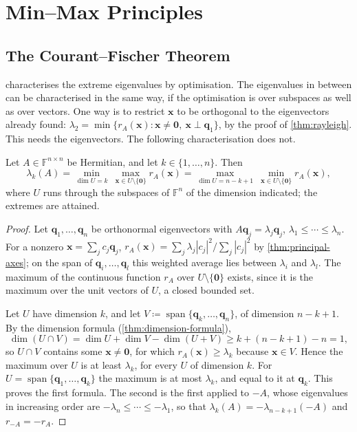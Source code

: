 \section{Min--Max Principles}
\label{sec:min-max}

\subsection{The Courant--Fischer Theorem}

 characterises the extreme eigenvalues by optimisation. The eigenvalues in between can be characterised in the same way, if the optimisation is over subspaces as well as over vectors. One way is to restrict $\mathbf x$ to be orthogonal to the eigenvectors already found: $\lambda_2=\min\{r_A(\mathbf x):\mathbf x\ne\mathbf 0,\ \mathbf x\perp\mathbf q_1\}$, by the proof of \cref{thm:rayleigh}. This needs the eigenvectors. The following characterisation does not.

\begin{theorem}
\label{thm:courant-fischer}
Let $A\in\mathbb F^{n\times n}$ be Hermitian, and let $k\in\{1,\ldots,n\}$. Then
\[
\lambda_k(A)=\min_{\dim U=k}\ \max_{\mathbf x\in U\setminus\{\mathbf 0\}}r_A(\mathbf x)=\max_{\dim U=n-k+1}\ \min_{\mathbf x\in U\setminus\{\mathbf 0\}}r_A(\mathbf x),
\]
where $U$ runs through the subspaces of $\mathbb F^n$ of the dimension indicated; the extremes are attained.
\end{theorem}

\begin{proof}
Let $\mathbf q_1,\ldots,\mathbf q_n$ be orthonormal eigenvectors with $A\mathbf q_j=\lambda_j\mathbf q_j$, $\lambda_1\le\cdots\le\lambda_n$. For a nonzero $\mathbf x=\sum_jc_j\mathbf q_j$, $r_A(\mathbf x)=\sum_j\lambda_j|c_j|^2/\sum_j|c_j|^2$ by \cref{thm:principal-axes}; on the span of $\mathbf q_i,\ldots,\mathbf q_l$ this weighted average lies between $\lambda_i$ and $\lambda_l$. The maximum of the continuous function $r_A$ over $U\setminus\{\mathbf 0\}$ exists, since it is the maximum over the unit vectors of $U$, a closed bounded set.

Let $U$ have dimension $k$, and let $V\coloneqq\operatorname{span}\{\mathbf q_k,\ldots,\mathbf q_n\}$, of dimension $n-k+1$. By the dimension formula (\cref{thm:dimension-formula}),
\[
\dim(U\cap V)=\dim U+\dim V-\dim(U+V)\ge k+(n-k+1)-n=1 ,
\]
so $U\cap V$ contains some $\mathbf x\ne\mathbf 0$, for which $r_A(\mathbf x)\ge\lambda_k$ because $\mathbf x\in V$. Hence the maximum over $U$ is at least $\lambda_k$, for every $U$ of dimension $k$. For $U=\operatorname{span}\{\mathbf q_1,\ldots,\mathbf q_k\}$ the maximum is at most $\lambda_k$, and equal to it at $\mathbf q_k$. This proves the first formula. The second is the first applied to $-A$, whose eigenvalues in increasing order are $-\lambda_n\le\cdots\le-\lambda_1$, so that $\lambda_k(A)=-\lambda_{n-k+1}(-A)$ and $r_{-A}=-r_A$.
\end{proof}

